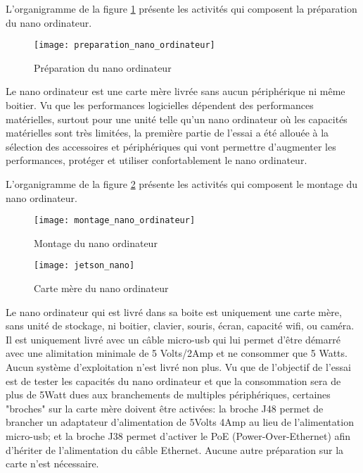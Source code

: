 ﻿\label{preparation_nano_ordinateur}
\par L'organigramme de la figure \ref{fig:preparation_nano_ordinateur} présente les activités qui composent la préparation du nano ordinateur. 
\begin{figure}[H]
    \centering
    \texttt{[image: preparation\_nano\_ordinateur]}
    \caption{Préparation du nano ordinateur}
    \label{fig:preparation_nano_ordinateur}
\end{figure}
\par Le nano ordinateur est une carte mère livrée sans aucun périphérique ni même boitier. Vu que les performances logicielles dépendent des performances matérielles, surtout pour une unité telle qu'un nano ordinateur où les capacités matérielles sont très limitées, la première partie de l'essai a été allouée à la sélection des accessoires et périphériques qui vont permettre d'augmenter les performances, protéger et utiliser confortablement le nano ordinateur. 
\label{montage_nano_ordinateur}
\par L'organigramme de la figure \ref{fig:montage_nano_ordinateur} présente les activités qui composent le montage du nano ordinateur. 
\begin{figure}[H]
    \centering
    \texttt{[image: montage\_nano\_ordinateur]}
    \caption{Montage du nano ordinateur}
    \label{fig:montage_nano_ordinateur}
\end{figure}
\begin{figure}[H]
    \centering
    \texttt{[image: jetson\_nano]}
    \caption{Carte mère du nano ordinateur}
    \label{fig:jetson_nano}
\end{figure}
\par Le nano ordinateur qui est livré dans sa boite est uniquement une carte mère, sans unité de stockage, ni boitier, clavier, souris, écran, capacité wifi, ou caméra. Il est uniquement livré avec un câble micro-usb qui lui permet d'être démarré avec une alimitation minimale de 5 Volts/2Amp et ne consommer que 5 Watts. Aucun système d'exploitation n'est livré non plus. Vu que de l'objectif de l'essai est de tester les capacités du nano ordinateur et que la consommation sera de plus de 5Watt dues aux branchements de multiples périphériques, certaines "broches" sur la carte mère doivent être activées:  la broche J48 permet de brancher un adaptateur d'alimentation de 5Volts 4Amp au lieu de l'alimentation micro-usb; et la broche J38 permet d'activer le PoE (Power-Over-Ethernet) afin d'hériter de l'alimentation du câble Ethernet. Aucune autre préparation sur la carte n'est nécessaire.

